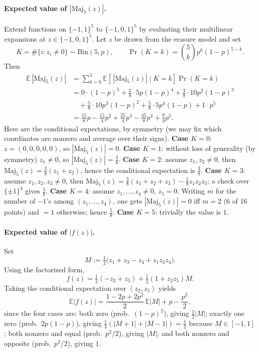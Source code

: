 \documentclass[11pt]{article}
\newcommand{\Maj}{\mathrm{Maj}}
\begin{document}
\paragraph{Expected value of $|\Maj_5(z)|$.}
Extend functions on $\{-1,1\}^5$ to $\{-1,0,1\}^5$ by evaluating their multilinear expansions at $z\in\{-1,0,1\}^5$. Let $z$ be drawn from the erasure model and set
\[
K=\#\{i:z_i\neq 0\}\sim\mathrm{Bin}(5,p),\qquad
\Pr(K=k)=\binom{5}{k}p^{k}(1-p)^{5-k}.
\]
Then
\begin{align*}
\mathbb{E}\,|\Maj_5(z)|
&=\sum_{k=0}^5 \mathbb{E}\!\left[\,|\Maj_5(z)|\mid K=k\right]\Pr(K=k)\\
&=0\cdot(1-p)^5+\tfrac{3}{8}\cdot 5p(1-p)^4+\tfrac{3}{8}\cdot 10p^2(1-p)^3\\
&\quad+\tfrac{5}{8}\cdot 10p^3(1-p)^2+\tfrac{5}{8}\cdot 5p^4(1-p)+1\cdot p^5\\
&=\tfrac{15}{8}p-\tfrac{15}{4}p^2+\tfrac{25}{4}p^3-\tfrac{45}{8}p^4+\tfrac{9}{4}p^5.
\end{align*}
Here are the conditional expectations, by symmetry (we may fix which coordinates are nonzero and average over their signs). \textbf{Case \(K=0\)}: \(z=(0,0,0,0,0)\), so \(|\Maj_5(z)|=0\).
\textbf{Case \(K=1\)}: without loss of generality (by symmetry) $z_1\neq0$, so \(|\Maj_5(z)|=\tfrac{3}{8}\).
\textbf{Case \(K=2\)}: assume $z_1,z_2\neq0$, then $\Maj_5(z)=\tfrac{3}{8}(z_1+z_2)$, hence the conditional expectation is $\tfrac{3}{8}$.
\textbf{Case \(K=3\)}: assume $z_1,z_2,z_3\neq0$, then $\Maj_5(z)=\tfrac{3}{8}(z_1+z_2+z_3)-\tfrac{1}{8}z_1z_2z_3$; a check over $\{\pm1\}^3$ gives $\tfrac{5}{8}$.
\textbf{Case \(K=4\)}: assume $z_1,\dots,z_4\neq0$, $z_5=0$. Writing $m$ for the number of $-1$'s among $(z_1,\dots,z_4)$, one gets $|\Maj_5(z)|=0$ iff $m=2$ (6 of 16 points) and $=1$ otherwise; hence $\tfrac{5}{8}$.
\textbf{Case \(K=5\)}: trivially the value is $1$.

\paragraph{Expected value of $|f(z)|$.}
Set
\[
M:=\tfrac12\!\big(z_1+z_3-z_4+z_1z_3z_4\big).
\]
Using the factorized form,
\[
f(z)=\tfrac12(-z_2+z_5)+\tfrac12(1+z_2z_5)M .
\]
Taking the conditional expectation over $(z_2,z_5)$ yields
\[
\mathbb{E}|f(z)|
=\frac{1-2p+2p^2}{2}\,\mathbb{E}|M|+p-\frac{p^2}{2},
\]
since the four cases are: both zero (prob.\ $(1-p)^2$), giving $\tfrac12|M|$; exactly one zero (prob.\ $2p(1-p)$), giving $\tfrac14(|M+1|+|M-1|)=\tfrac12$ because $M\in[-1,1]$; both nonzero and equal (prob.\ $p^2/2$), giving $|M|$; and both nonzero and opposite (prob.\ $p^2/2$), giving $1$.
\end{document}
